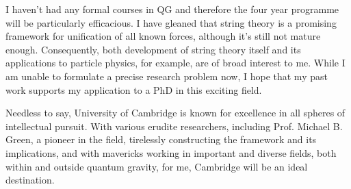 I haven't had any formal courses in QG and therefore the four year programme will be particularly efficacious. I have gleaned that string theory is a promising framework for unification of all known forces, although it's still not mature enough. Consequently, both development of string theory itself and its applications to particle physics, for example, are of broad interest to me. While I am unable to formulate a precise research problem now, I hope that my past work supports my application to a PhD in this exciting field.

Needless to say, University of Cambridge is known for excellence in all spheres of intellectual pursuit. With various erudite researchers, including Prof. Michael B. Green, a pioneer in the field, tirelessly constructing the framework and its implications, and with mavericks working in important and diverse fields, both within and outside quantum gravity, for me, Cambridge will be an ideal destination.
 




